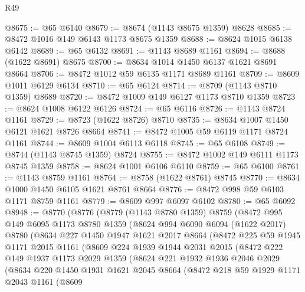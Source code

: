 \begin{lexlean}{R49}
\begin{coremodule}
@8675 := @65 @6140
@8679 := @8674 (@1143 @8675 @1359) @8628
@8685 := @8472 @1016 @149 @6143 @1173 @8675 @1359
@8688 := @8624 @1015 @6138 @6142
@8689 := @65 @6132
@8691 := @1143 @8689 @1161
@8694 := @8688 (@1622 @8691) @8675
@8700 := @8634 @1014 @1450 @6137 @1621 @8691 @8664
@8706 := @8472 @1012 @59 @6135 @1171 @8689 @1161
@8709 := @8609 @1011 @6129 @6134
@8710 := @65 @6124
@8714 := @8709 (@1143 @8710 @1359) @8689
@8720 := @8472 @1009 @149 @6127 @1173 @8710 @1359
@8723 := @8624 @1008 @6122 @6126
@8724 := @65 @6116
@8726 := @1143 @8724 @1161
@8729 := @8723 (@1622 @8726) @8710
@8735 := @8634 @1007 @1450 @6121 @1621 @8726 @8664
@8741 := @8472 @1005 @59 @6119 @1171 @8724 @1161
@8744 := @8609 @1004 @6113 @6118
@8745 := @65 @6108
@8749 := @8744 (@1143 @8745 @1359) @8724
@8755 := @8472 @1002 @149 @6111 @1173 @8745 @1359
@8758 := @8624 @1001 @6106 @6110
@8759 := @65 @6100
@8761 := @1143 @8759 @1161
@8764 := @8758 (@1622 @8761) @8745
@8770 := @8634 @1000 @1450 @6105 @1621 @8761 @8664
@8776 := @8472 @998 @59 @6103 @1171 @8759 @1161
@8779 := @8609 @997 @6097 @6102
@8780 := @65 @6092
@8948 := @8770
    (@8776
      (@8779
        (@1143 @8780 @1359)
        @8759
        (@8472
          @995
          @149
          @6095
          @1173
          @8780
          @1359
          (@8624
            @994
            @6090
            @6094
            (@1622 @2017)
            @8780
            (@8634
              @227
              @1450
              @1947
              @1621
              @2017
              @8664
              (@8472
                @225
                @59
                @1945
                @1171
                @2015
                @1161
                (@8609
                  @224
                  @1939
                  @1944
                  @2031
                  @2015
                  (@8472
                    @222
                    @149
                    @1937
                    @1173
                    @2029
                    @1359
                    (@8624
                      @221
                      @1932
                      @1936
                      @2046
                      @2029
                      (@8634
                        @220
                        @1450
                        @1931
                        @1621
                        @2045
                        @8664
                        (@8472
                          @218
                          @59
                          @1929
                          @1171
                          @2043
                          @1161
                          (@8609

\end{coremodule}
\end{lexlean}

